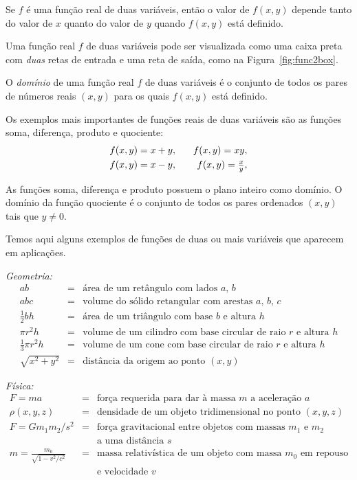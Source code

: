 Se $f$ é uma função real de duas variáveis, então o valor
de $f(x,y)$ depende tanto do valor de $x$ quanto do valor
de $y$ quando $f(x,y)$ está definido.

Uma função real $f$ de duas variáveis pode ser visualizada
como uma caixa preta com \emph{duas} retas de entrada e uma
reta de saída, como na Figura~\ref{fig:func2box}.


O \emph{domínio} de uma função real $f$ de duas variáveis é
o conjunto de todos os pares de números reais $(x,y)$ para os
quais $f(x,y)$ está definido.

Os exemplos mais importantes de funções reais de duas variáveis
são as funções soma, diferença, produto e quociente:
\begin{eqnarray*}
  f(x,y) = x+y, & \hspace{2ex} & f(x,y) = xy, \\
  f(x,y) = x-y, & \hspace{2ex} & \textstyle f(x,y) = \frac{x}{y},
\end{eqnarray*}

As funções soma, diferença e produto possuem o plano inteiro
como domínio. O domínio da função quociente é o conjunto de
todos os pares ordenados $(x,y)$ tais que $y \ne 0$.

Temos aqui alguns exemplos de funções de duas ou mais variáveis
que aparecem em aplicações.

\emph{Geometria:}
\begin{eqnarray*}
  ab & = & \text{área de um retângulo com lados $a$, $b$} \\
 abc & = & \text{volume do sólido retangular com arestas $a$, $b$, $c$} \\
\textstyle
\frac{1}{2}bh & = & \text{área de um triângulo com base $b$ e altura $h$} \\
\pi r^2 h & = & \text{volume de um cilindro com base circular de raio $r$ e altura $h$} \\
\textstyle
\frac{1}{3} \pi r^2 h & = & \text{volume de um cone com base circular
                            de raio $r$ e altura $h$} \\
\textstyle
\sqrt{x^2 + y^2} & = & \text{distância da origem ao ponto } (x,y)
\end{eqnarray*}

\emph{Física:}
\begin{eqnarray*}
 F = ma & = & \text{força requerida para dar à massa $m$ a aceleração $a$} \\
\rho(x,y,z) & = & \text{densidade de um objeto tridimensional no ponto $(x,y,z)$} \\
 F = G m_1 m_2 / s^2 & = &
    \text{força gravitacional entre objetos com massas $m_1$ e $m_2$} \\
                     &   &
    \text{a uma distância $s$}\\
 m = \frac{m_0}{\sqrt{1-v^2/c^2}} & = &
    \text{massa relativística de um objeto com massa $m_0$ em repouso} \\[-8pt]
                                  &   &
    \text{e velocidade $v$}
\end{eqnarray*}

